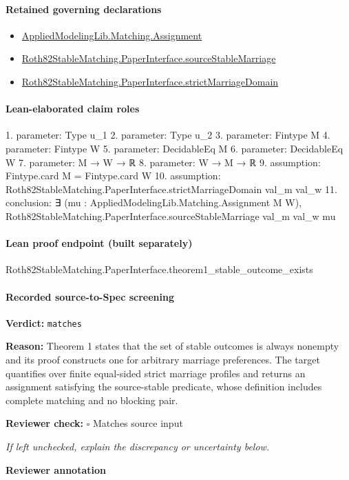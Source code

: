 \documentclass[10pt]{article}
\newcommand{\reviewerbox}{%
  \par\noindent\fbox{\parbox{0.96\linewidth}{\rule{0pt}{0.38in}}}\par
}
\newcommand{\reviewmatch}[1]{%
  \par\noindent\textbf{Reviewer check:} $\square$\; #1\par
  \noindent\emph{If left unchecked, explain the discrepancy or uncertainty below.}\par
}
\begin{document}
\paragraph{Retained governing declarations}
\begin{itemize}\raggedright
\item \hyperlink{governing-declaration-508c084086b006b8}{Applied\allowbreak{}Modeling\allowbreak{}Lib.\allowbreak{}Matching.\allowbreak{}Assignment}
\item \hyperlink{paper-prerequisite-42fca1f7c299639c}{Roth82\allowbreak{}Stable\allowbreak{}Matching.\allowbreak{}Paper\allowbreak{}Interface.\allowbreak{}source\allowbreak{}Stable\allowbreak{}Marriage}
\item \hyperlink{governing-declaration-d06ec2a2987f0c72}{Roth82\allowbreak{}Stable\allowbreak{}Matching.\allowbreak{}Paper\allowbreak{}Interface.\allowbreak{}strict\allowbreak{}Marriage\allowbreak{}Domain}
\end{itemize}
\paragraph{Lean-elaborated claim roles}\begin{ReviewVerbatim}
1. parameter: Type u_1
2. parameter: Type u_2
3. parameter: Fintype M
4. parameter: Fintype W
5. parameter: DecidableEq M
6. parameter: DecidableEq W
7. parameter: M → W → ℝ
8. parameter: W → M → ℝ
9. assumption: Fintype.card M = Fintype.card W
10. assumption: Roth82StableMatching.PaperInterface.strictMarriageDomain val_m val_w
11. conclusion: ∃ (mu : AppliedModelingLib.Matching.Assignment M W),
  Roth82StableMatching.PaperInterface.sourceStableMarriage val_m val_w mu
\end{ReviewVerbatim}

\paragraph{Lean proof endpoint (built separately)}\begin{ReviewVerbatim}
Roth82StableMatching.PaperInterface.theorem1_stable_outcome_exists
\end{ReviewVerbatim}

\paragraph{Recorded source-to-Spec screening}
\textbf{Verdict:} \texttt{matches}
\\
{\raggedright
\textbf{Reason:} Theorem 1 states that the set of stable outcomes is always nonempty and its proof constructs one for arbitrary marriage preferences.\allowbreak{}  The target quantifies over finite equal-\allowbreak{}sided strict marriage profiles and returns an assignment satisfying the source-\allowbreak{}stable predicate, whose definition includes complete matching and no blocking pair.\allowbreak{}
\par}
\reviewmatch{Matches source input}
\noindent\textbf{Reviewer annotation}\par
\reviewerbox
\clearpage
\hypertarget{source-claim-e0f372cfa20685ca}{}
\end{document}
